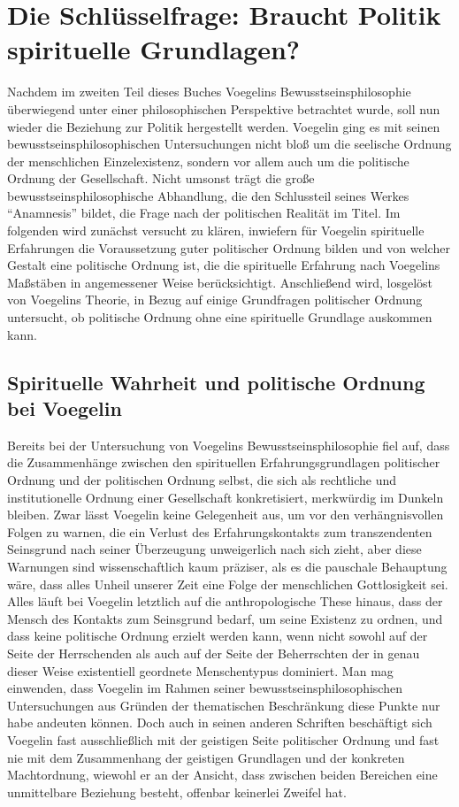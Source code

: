 \chapter{Die Schlüsselfrage: Braucht Politik spirituelle Grundlagen?}
\label{SpirituellePolitik}
Nachdem im zweiten Teil dieses Buches Voegelins Bewusstseinsphilosophie
überwiegend unter einer philosophischen Perspektive betrachtet wurde, soll nun
wieder die Beziehung zur Politik hergestellt werden. Voegelin ging es mit
seinen bewusstseinsphilosophischen Untersuchungen nicht bloß um die seelische
Ordnung der menschlichen Einzelexistenz, sondern vor allem auch um die
politische Ordnung der Gesellschaft. Nicht umsonst trägt die große
bewusstseinsphilosophische Abhandlung, die den Schlussteil seines Werkes
"`Anamnesis"' bildet, die Frage nach der politischen Realität im Titel. Im
folgenden wird zunächst versucht zu klären, inwiefern für Voegelin spirituelle
Erfahrungen die Voraussetzung guter politischer Ordnung bilden und von welcher
Gestalt eine politische Ordnung ist, die die spirituelle Erfahrung nach
Voegelins Maßstäben in angemessener Weise berücksichtigt. Anschließend wird,
losgelöst von Voegelins Theorie, in Bezug auf einige Grundfragen politischer
Ordnung untersucht, ob politische Ordnung ohne eine spirituelle Grundlage
auskommen kann.

\section{Spirituelle Wahrheit und politische Ordnung bei Voegelin}

Bereits bei der Untersuchung von Voegelins Bewusstseinsphilosophie fiel auf,
dass die Zusammenhänge zwischen den spirituellen Erfahrungsgrundlagen
politischer Ordnung und der politischen Ordnung selbst, die sich als
rechtliche und institutionelle Ordnung einer Gesellschaft konkretisiert,
merkwürdig im Dunkeln bleiben. Zwar lässt Voegelin keine Gelegenheit aus, um
vor den verhängnisvollen Folgen zu warnen, die ein Verlust des
Erfahrungskontakts zum transzendenten Seinsgrund nach seiner Überzeugung
unweigerlich nach sich zieht, aber diese Warnungen sind wissenschaftlich kaum
präziser, als es die pauschale Behauptung wäre, dass alles Unheil unserer Zeit
eine Folge der menschlichen Gottlosigkeit sei. Alles läuft bei Voegelin
letztlich auf die anthropologische These hinaus, dass der Mensch des Kontakts
zum Seinsgrund bedarf, um seine Existenz zu ordnen, und dass keine politische
Ordnung erzielt werden kann, wenn nicht sowohl auf der Seite der Herrschenden
als auch auf der Seite der Beherrschten der in genau dieser Weise existentiell
geordnete Menschentypus dominiert. Man mag einwenden, dass Voegelin im Rahmen
seiner bewusstseinsphilosophischen Untersuchungen aus Gründen der thematischen
Beschränkung diese Punkte nur habe andeuten können. Doch auch in seinen
anderen Schriften beschäftigt sich Voegelin fast ausschließlich mit der
geistigen Seite politischer Ordnung und fast nie mit dem Zusammenhang der
geistigen Grundlagen und der konkreten Machtordnung, wiewohl er an der
Ansicht, dass zwischen beiden Bereichen eine unmittelbare Beziehung besteht,
offenbar keinerlei Zweifel hat.

